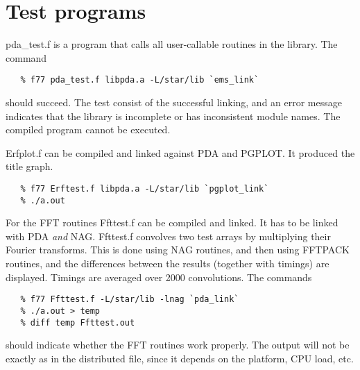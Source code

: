 
\section{Test programs}

   pda\_test.f is a program that calls all user-callable routines in the
   library. The command

\begin{verbatim}
   % f77 pda_test.f libpda.a -L/star/lib `ems_link`
\end{verbatim}

   should succeed. The test consist of the successful linking, and an
   error message indicates that the library is incomplete or has
   inconsistent module names. The compiled program cannot be executed.

   Erfplot.f can be compiled and linked against PDA and PGPLOT. It
   produced the title graph.

\begin{verbatim}
   % f77 Erftest.f libpda.a -L/star/lib `pgplot_link`
   % ./a.out
\end{verbatim}

   For the FFT routines Ffttest.f can be compiled and linked. It has to
   be linked with PDA {\em and\/} NAG. Ffttest.f convolves two
   test arrays by multiplying their Fourier transforms. This is done
   using NAG routines, and then using FFTPACK routines, and the
   differences between the results (together with timings) are
   displayed. Timings are averaged over 2000 convolutions. The commands

\begin{verbatim}
   % f77 Ffttest.f -L/star/lib -lnag `pda_link`
   % ./a.out > temp
   % diff temp Ffttest.out
\end{verbatim}

   should indicate whether the FFT routines work properly. The output
   will not be exactly as in the distributed file, since it depends on
   the platform, CPU load, etc.


